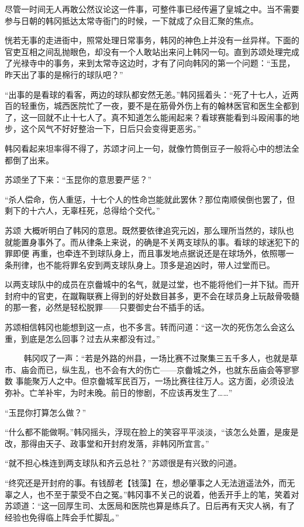 尽管一时间无人再敢公然议论这一件事，可整件事已经传遍了皇城之中。当不需要参与日朝的韩冈抵达太常寺衙门的时候，一下就成了众目汇聚的焦点。

恍若无事的走进衙中，照常处理日常事务，韩冈的神色上并没有一丝异样。下面的官吏互相之间乱抛眼色，却没有一个人敢站出来问上韩冈一句。直到苏颂处理完成了光禄寺中的事务，来到太常寺这边时，才有了问向韩冈的第一个问题：“玉昆，昨天出了事的是棉行的球队吧？”

“出事的是看球的看客，两边的球队都安然无恙。”韩冈摇着头：“死了十七人，近两百的轻重伤，城西医院忙了一夜，要不是在筋骨外伤上有的翰林医官和医生全都到了，这一回就不止十七人了。真不知道怎么能闹起来？看球赛能看到斗殴闹事的地步，这个风气不好好整治一下，日后只会变得更恶劣。”

韩冈看起来坦率得不得了，苏颂才问上一句，就像竹筒倒豆子一般将心中的想法全都倒了出来。

苏颂坐了下来：“玉昆你的意思要严惩？”

“杀人偿命，伤人重惩，十七个人的性命岂能就此罢休？那位南顺侯倒也罢了，但剩下的十六人，无辜枉死，总得给个交代。”

苏颂 大概听明白了韩冈的意思。既然要依律追究元凶，那么理所当然的，球队也就能置身事外了。而从律条上来说，的确是不关两支球队的事。看球的球迷犯下的罪即便 再重，也牵连不到球队身上，而且事发地点据说还是在球场外，依照哪一条刑律，也不能将罪名安到两支球队身上。顶多是追凶时，带人过堂而已。

以两支球队中的成员在京齤城中的名气，就是过堂，也不能将他们一并下狱。而开封府中的官吏，在蹴鞠联赛上得到的好处数目甚多，更不会在球员身上玩敲骨吸髓的那一套，必然是轻松脱罪——只要御史台不插手的话。

苏颂相信韩冈也能想到这一点，也不多言。转而问道：“这一次的死伤怎么会这么重，到底是怎么回事？过去从来都没有过。”

　 　韩冈叹了一声：“若是外路的州县，一场比赛不过聚集三五千多人，也就是草市、庙会而已，纵生乱，也不会有大的伤亡——京齤城之外，也就东岳庙会等寥寥数 事能聚万人之中。但京齤城军民百万，一场比赛往往万人。这方面，必须设法弥补。亡羊补牢，为时未晚。前日的惨剧，不应该再发生了……”

“玉昆你打算怎么做？”

“什么都不能做啊。”韩冈摇头，浮现在脸上的笑容平平淡淡，“该怎么处置，是废是改，那得由天子、政事堂和开封府发落，非韩冈所宜言。”

“就不担心株连到两支球队和齐云总社？”苏颂很是有兴致的问道。

“终究还是开封府的事。有钱醇老【钱藻】在，想必肇事之人无法逍遥法外，而无辜之人，也不至于蒙受不白之冤。”韩冈事不关己的说着，他丢开手上的笔，笑着对苏颂道：“这一回厚生司、太医局和医院也算是练兵了。日后再有天灾人祸，有了经验也免得临上阵会手忙脚乱。”

